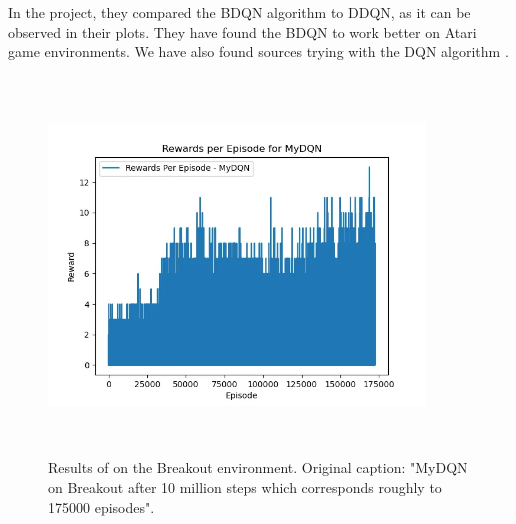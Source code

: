 \documentclass{article}
\begin{document}
In the \cite{BDQN} project, they compared the BDQN algorithm to DDQN, as it can be observed in their plots. They have found the BDQN to work better on Atari game environments. We have also found sources trying with the DQN algorithm \cite{DQN}.

\begin{figure}[H]
    \centering
\includegraphics[width=10cm,height=10cm,keepaspectratio]{img/1.png}
\caption{Results of \cite{DQN} on the Breakout environment. Original caption: "MyDQN on Breakout after 10 million steps which corresponds roughly to 175000 episodes".}
\end{figure}
\end{document}
